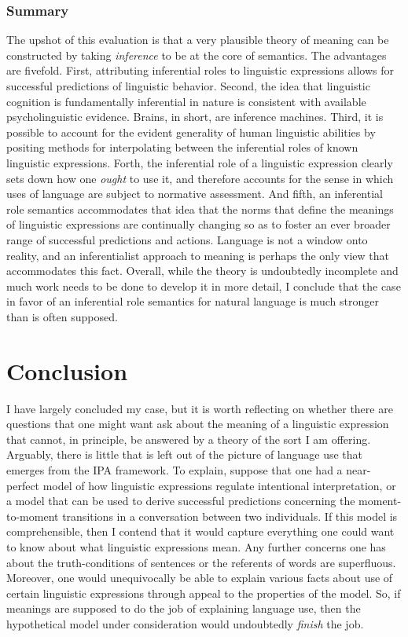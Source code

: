 \subsubsection{Summary}

The upshot of this evaluation is that a very plausible theory of meaning can be constructed by taking \textit{inference} to be at the core of semantics. The advantages are fivefold. First, attributing inferential roles to linguistic expressions allows for successful predictions of linguistic behavior. Second, the idea that linguistic cognition is fundamentally inferential in nature is consistent with available psycholinguistic evidence. Brains, in short, are inference machines. Third, it is possible to account for the evident generality of human linguistic abilities by positing methods for interpolating between the inferential roles of known linguistic expressions. Forth, the inferential role of a linguistic expression clearly sets down how one \textit{ought} to use it, and therefore accounts for the sense in which uses of language are subject to normative assessment. And fifth, an inferential role semantics accommodates that idea that the norms that define the meanings of linguistic expressions are continually changing so as to foster an ever broader range of successful predictions and actions. Language is not a window onto reality, and an inferentialist approach to meaning is perhaps the only view that accommodates this fact. Overall, while the theory is undoubtedly incomplete and much work needs to be done to develop it in more detail, I conclude that the case in favor of an inferential role semantics for natural language is much stronger than is often supposed. 

\section{Conclusion}

I have largely concluded my case, but it is worth reflecting on whether there are questions that one might want ask about the meaning of a linguistic expression that cannot, in principle, be answered by a theory of the sort I am offering. Arguably, there is little that is left out of the picture of language use that emerges from the IPA framework. To explain, suppose that one had a near-perfect model of how linguistic expressions regulate intentional interpretation, or a model that can be used to derive successful predictions concerning the moment-to-moment transitions in a conversation between two individuals. If this model is comprehensible, then I contend that it would capture everything one could want to know about what linguistic expressions mean. Any further concerns one has about the truth-conditions of sentences or the referents of words are superfluous. Moreover, one would unequivocally be able to explain various facts about use of certain linguistic expressions through appeal to the properties of the model. So, if meanings are supposed to do the job of explaining language use, then the hypothetical model under consideration would undoubtedly \textit{finish} the job.

